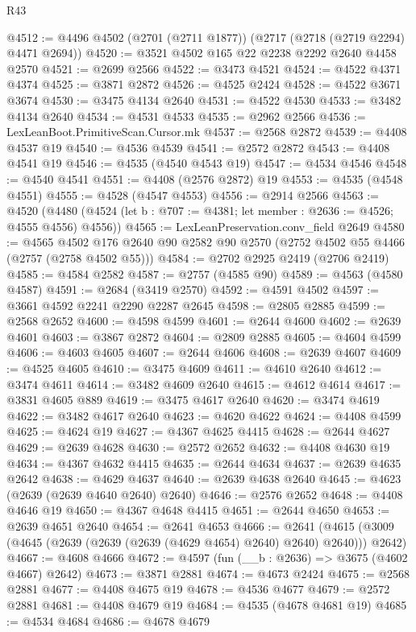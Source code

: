 \begin{lexlean}{R43}
\begin{coremodule}
@4512 := @4496 @4502 (@2701 (@2711 @1877)) (@2717 (@2718 (@2719 @2294) @4471 @2694))
@4520 := @3521 @4502 @165 @22 @2238 @2292 @2640 @4458 @2570
@4521 := @2699 @2566
@4522 := @3473 @4521
@4524 := @4522 @4371 @4374
@4525 := @3871 @2872
@4526 := @4525 @2424
@4528 := @4522 @3671 @3674
@4530 := @3475 @4134 @2640
@4531 := @4522 @4530
@4533 := @3482 @4134 @2640
@4534 := @4531 @4533
@4535 := @2962 @2566
@4536 := LexLeanBoot.PrimitiveScan.Cursor.mk
@4537 := @2568 @2872
@4539 := @4408 @4537 @19
@4540 := @4536 @4539
@4541 := @2572 @2872
@4543 := @4408 @4541 @19
@4546 := @4535 (@4540 @4543 @19)
@4547 := @4534 @4546
@4548 := @4540 @4541
@4551 := @4408 (@2576 @2872) @19
@4553 := @4535 (@4548 @4551)
@4555 := @4528 (@4547 @4553)
@4556 := @2914 @2566
@4563 := @4520
    (@4480 (@4524 (let b : @707 := @4381; let member : @2636 := @4526; @4555 @4556) @4556))
@4565 := LexLeanPreservation.conv_field @2649
@4580 := @4565
    @4502
    @176
    @2640
    @90
    @2582
    @90
    @2570
    (@2752 @4502 @55 @4466 (@2757 (@2758 @4502 @55)))
@4584 := @2702 @2925 @2419 (@2706 @2419)
@4585 := @4584 @2582
@4587 := @2757 (@4585 @90)
@4589 := @4563 (@4580 @4587)
@4591 := @2684 (@3419 @2570)
@4592 := @4591 @4502
@4597 := @3661 @4592 @2241 @2290 @2287 @2645
@4598 := @2805 @2885
@4599 := @2568 @2652
@4600 := @4598 @4599
@4601 := @2644 @4600
@4602 := @2639 @4601
@4603 := @3867 @2872
@4604 := @2809 @2885
@4605 := @4604 @4599
@4606 := @4603 @4605
@4607 := @2644 @4606
@4608 := @2639 @4607
@4609 := @4525 @4605
@4610 := @3475 @4609
@4611 := @4610 @2640
@4612 := @3474 @4611
@4614 := @3482 @4609 @2640
@4615 := @4612 @4614
@4617 := @3831 @4605 @889
@4619 := @3475 @4617 @2640
@4620 := @3474 @4619
@4622 := @3482 @4617 @2640
@4623 := @4620 @4622
@4624 := @4408 @4599
@4625 := @4624 @19
@4627 := @4367 @4625 @4415
@4628 := @2644 @4627
@4629 := @2639 @4628
@4630 := @2572 @2652
@4632 := @4408 @4630 @19
@4634 := @4367 @4632 @4415
@4635 := @2644 @4634
@4637 := @2639 @4635 @2642
@4638 := @4629 @4637
@4640 := @2639 @4638 @2640
@4645 := @4623 (@2639 (@2639 @4640 @2640) @2640)
@4646 := @2576 @2652
@4648 := @4408 @4646 @19
@4650 := @4367 @4648 @4415
@4651 := @2644 @4650
@4653 := @2639 @4651 @2640
@4654 := @2641 @4653
@4666 := @2641 (@4615 (@3009 (@4645 (@2639 (@2639 (@2639 (@4629 @4654) @2640) @2640) @2640))) @2642)
@4667 := @4608 @4666
@4672 := @4597 (fun (__b : @2636) => @3675 (@4602 @4667) @2642)
@4673 := @3871 @2881
@4674 := @4673 @2424
@4675 := @2568 @2881
@4677 := @4408 @4675 @19
@4678 := @4536 @4677
@4679 := @2572 @2881
@4681 := @4408 @4679 @19
@4684 := @4535 (@4678 @4681 @19)
@4685 := @4534 @4684
@4686 := @4678 @4679

\end{coremodule}
\end{lexlean}
